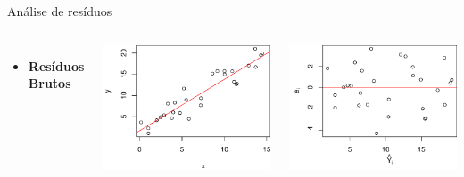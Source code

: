 \documentclass{beamer}\usepackage[]{graphicx}\usepackage[]{color}
\newenvironment{knitrout}{}{} %
\renewenvironment{knitrout}{\setlength{\topsep}{0mm}}{}
\begin{document}
\begin{frame}{Análise de resíduos}

\begin{columns}[t]

\small

\begin{itemize}
\item \textbf{Resíduos Brutos} 
\end{itemize}


\begin{knitrout}
\color{fgcolor}
\includegraphics[width=1\linewidth]{figure/rawres-1} 

\includegraphics[width=1\linewidth]{figure/rawres-2} 

\end{knitrout}
\end{columns}


\end{frame}
\end{document}
